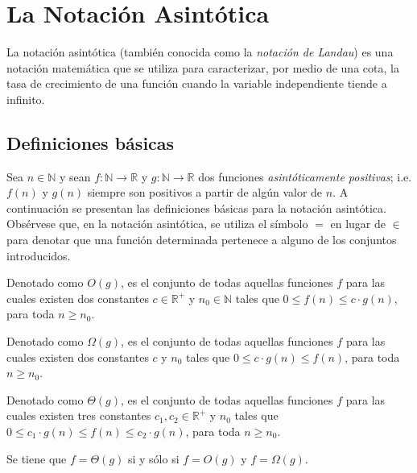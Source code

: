 
\chapter{La Notación Asintótica}

La notación asintótica (también conocida como la \emph{notación de
Landau}) es una notación matemática que se utiliza para caracterizar,
por medio de una cota, la tasa de crecimiento de una función cuando
la variable independiente tiende a infinito.

\section{Definiciones básicas}

Sea $n\in\mathbb{N}$ y sean $f:\mathbb{N}\to\mathbb{R}$ y $g:\mathbb{N}\to\mathbb{R}$
dos funciones \emph{asintóticamente positivas}; i.e. $f(n)$ y $g(n)$
siempre son positivos a partir de algún valor de $n$. A continuación
se presentan las definiciones básicas para la notación asintótica.
Obsérvese que, en la notación asintótica, se utiliza el símbolo $=$
en lugar de $\in$ para denotar que una función determinada pertenece
a alguno de los conjuntos introducidos.
\begin{defn}[O grande]
Denotado como $O(g)$, es el conjunto de todas aquellas funciones
$f$ para las cuales existen dos constantes $c\in\mathbb{R}^{+}$
y $n_{0}\in\mathbb{N}$ tales que $0\le f(n)\leq c\cdot g(n)$, para
toda $n\geq n_{0}$. 
\end{defn}
%
\begin{defn}
Denotado como $\Omega(g)$, es el conjunto de todas aquellas funciones
$f$ para las cuales existen dos constantes $c$ y $n_{0}$ tales
que $0\le c\cdot g(n)\leq f(n)$, para toda $n\geq n_{0}$.
\end{defn}
%
\begin{defn}
Denotado como $\Theta(g)$, es el conjunto de todas aquellas funciones
$f$ para las cuales existen tres constantes $c_{1},c_{2}\in\mathbb{R}^{+}$
y $n_{0}$ tales que $0\le c_{1}\cdot g(n)\leq f(n)\leq c_{2}\cdot g(n)$,
para toda $n\geq n_{0}$.
\end{defn}
\begin{prop}
Se tiene que $f=\Theta(g)$ si y sólo si $f=O(g)$ y $f=\Omega(g)$.
\end{prop}
